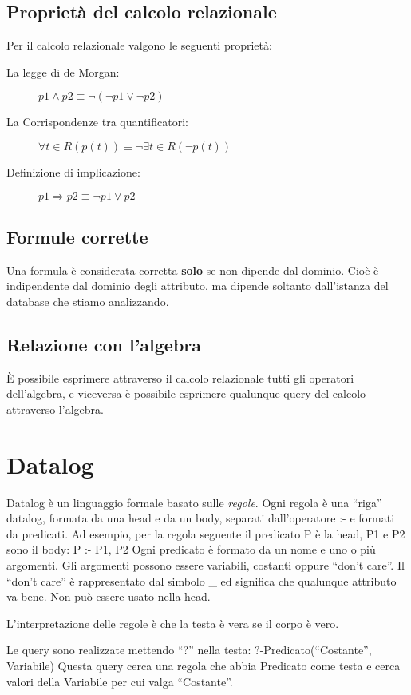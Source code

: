 \documentclass[\main/main.tex]{subfiles}
\begin{document}
\subsection{Proprietà del calcolo relazionale}
Per il calcolo relazionale valgono le seguenti proprietà:
\begin{description}
  \item[La legge di de Morgan:] $ p1 \wedge  p2 \equiv \neg (\neg p1 \vee \neg p2 ) $
  \item [La Corrispondenze tra quantificatori:]  $\forall t \in R (p(t)) \equiv \neg \exists t \in R (\neg p(t))$
  \item[Definizione di implicazione:] $p1  \Rightarrow  p2 \equiv \neg p1 \vee p2$
\end{description}

\subsection{Formule corrette}
Una formula è considerata corretta \textbf{solo} se non dipende dal dominio. Cioè è indipendente dal dominio degli attributo, ma dipende soltanto dall'istanza del database che stiamo analizzando.

\subsection{Relazione con l'algebra}
È possibile esprimere attraverso il calcolo relazionale tutti gli operatori dell'algebra, e viceversa è possibile esprimere qualunque query del calcolo attraverso l'algebra.

\section{Datalog}
Datalog è un linguaggio formale basato sulle \textit{regole}.
Ogni regola è una ``riga'' datalog, formata da una head e da un body, separati dall'operatore :- e formati da predicati.
Ad esempio, per la regola seguente il predicato P è la head, P1 e P2 sono il body:
P :- P1, P2
Ogni predicato è formato da un nome e uno o più argomenti.
Gli argomenti possono essere variabili, costanti oppure ``don't care''. Il ``don't care'' è rappresentato dal simbolo \_ ed significa che qualunque attributo va bene. Non può essere usato nella head.

L'interpretazione delle regole è che la testa è vera se il corpo è vero.

Le query sono realizzate mettendo ``?'' nella testa:
?-Predicato(``Costante'', Variabile)
Questa query cerca una regola che abbia Predicato come testa e cerca valori della Variabile per cui valga ``Costante''.
\end{document}
